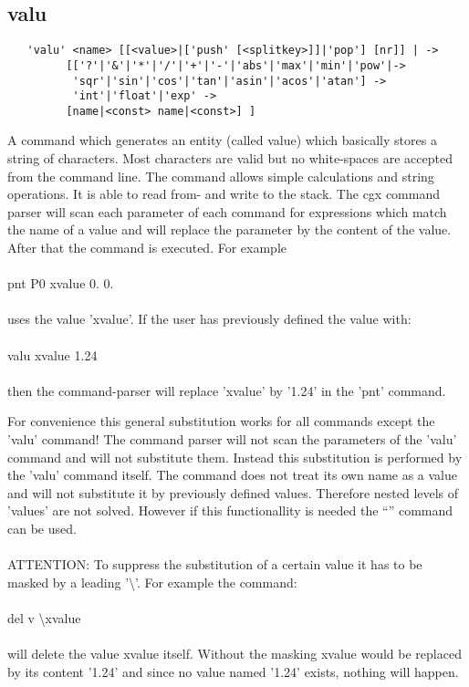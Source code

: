 \documentclass{article}
\begin{document}
\subsection{\label{valu}valu}
\begin{verbatim}
   'valu' <name> [[<value>|['push' [<splitkey>]]|'pop'] [nr]] | ->
         [['?'|'&'|'*'|'/'|'+'|'-'|'abs'|'max'|'min'|'pow'|->
          'sqr'|'sin'|'cos'|'tan'|'asin'|'acos'|'atan'] ->
          'int'|'float'|'exp' ->
         [name|<const> name|<const>] ]
\end{verbatim}
A command which generates an entity (called value) which basically stores a string of characters. Most characters are valid but no white-spaces are accepted from the command line. The command allows simple calculations and string operations. It is able to read from- and write to the stack.
The cgx command parser will scan each parameter of each command for expressions which match the name of a value and will replace the parameter by the content of the value. After that the command is executed. For example\\\\pnt P0 xvalue 0. 0.\\\\uses the value 'xvalue'. If the user has previously defined the value with:\\\\valu xvalue 1.24\\\\then the command-parser will replace 'xvalue' by '1.24' in the 'pnt' command.

For convenience this general substitution works for all commands except the 'valu' command! The command parser will not scan the parameters of the 'valu' command and will not substitute them. Instead this substitution is performed by the 'valu' command itself. The command does not treat its own name as a value and will not substitute it by previously defined values. Therefore nested levels of 'values' are not solved. However if this functionallity is needed the ``'' command can be used.\\\\

ATTENTION: To suppress the substitution of a certain value it has to be masked by a leading '\textbackslash{}'. For example the command:\\\\del v \textbackslash{}xvalue\\\\will delete the value xvalue itself. Without the masking xvalue would be replaced by its content '1.24' and since no value named '1.24' exists, nothing will happen.
\end{document}
